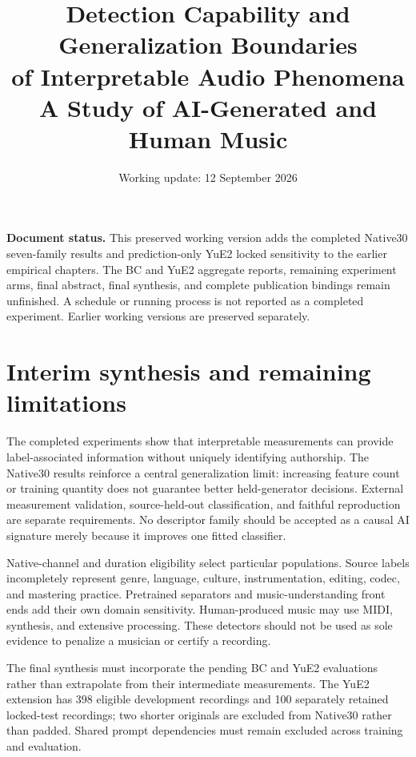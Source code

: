 \documentclass[11pt,a4paper]{article}
\title{Detection Capability and Generalization Boundaries\\of Interpretable Audio Phenomena\\
\large A Study of AI-Generated and Human Music}
\author{}
\date{Working update: 12 September 2026}
\begin{document}
\maketitle
\noindent\textbf{Document status.} This preserved working version adds the completed
Native30 seven-family results and prediction-only YuE2 locked sensitivity to
the earlier empirical chapters. The BC and YuE2 aggregate reports, remaining
experiment arms, final abstract, final synthesis, and complete publication bindings
remain unfinished. A schedule or running process is not reported as a completed
experiment. Earlier working versions are preserved separately.
\tableofcontents
\clearpage












\section{Interim synthesis and remaining limitations}
The completed experiments show that interpretable measurements can provide
label-associated information without uniquely identifying authorship. The
Native30 results reinforce a central generalization limit: increasing feature
count or training quantity does not guarantee better held-generator decisions.
External measurement validation, source-held-out classification, and faithful
reproduction are separate requirements. No descriptor family should be accepted
as a causal AI signature merely because it improves one fitted classifier.

Native-channel and duration eligibility select particular populations. Source
labels incompletely represent genre, language, culture, instrumentation, editing,
codec, and mastering practice. Pretrained separators and music-understanding
front ends add their own domain sensitivity. Human-produced music may use MIDI,
synthesis, and extensive processing. These detectors should not be used as sole
evidence to penalize a musician or certify a recording.

The final synthesis must incorporate the pending BC and YuE2 evaluations rather
than extrapolate from their intermediate measurements. The YuE2 extension has
398 eligible development recordings and 100 separately retained locked-test
recordings; two shorter originals are excluded from Native30 rather than padded.
Shared prompt dependencies must remain excluded across training and evaluation.



\end{document}
